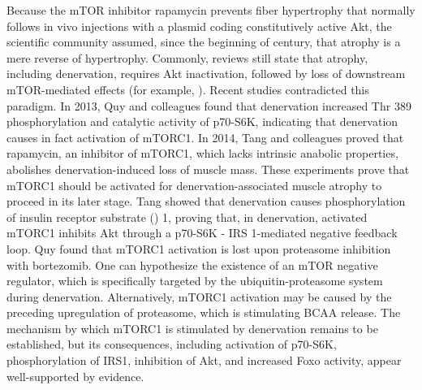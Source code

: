 \documentclass[12pt,english]{report}\usepackage[]{graphicx}\usepackage[]{color}
\begin{document}
Because the mTOR inhibitor rapamycin prevents fiber hypertrophy that
normally follows in vivo injections with a plasmid coding constitutively
active Akt\citep{bodine2001akt/mtor}, the scientific community assumed,
since the beginning of century, that atrophy is a mere reverse of
hypertrophy. Commonly, reviews still state that atrophy, including
denervation, requires Akt inactivation, followed by loss of downstream
mTOR-mediated effects (for example, \citep{zhao2007foxo3,schiaffino2013mechanisms}).
Recent studies contradicted this paradigm. In 2013, Quy and colleagues
found that denervation increased Thr 389 phosphorylation and catalytic
activity of p70-S6K, indicating that denervation causes in fact activation
of mTORC1\citep{quy2013proteasome-dependent}. In 2014, Tang and colleagues
proved that rapamycin, an inhibitor of mTORC1, which lacks intrinsic
anabolic properties, abolishes denervation-induced loss of muscle
mass\citep{tang2014mtorc1}. These experiments prove that mTORC1 should
be activated for denervation-associated muscle atrophy to proceed
in its later stage. Tang showed that denervation causes phosphorylation
of insulin receptor substrate ()
1, proving that, in denervation, activated mTORC1 inhibits Akt through
a p70-S6K - IRS 1-mediated negative feedback loop. Quy found that
mTORC1 activation is lost upon proteasome inhibition with bortezomib.
One can hypothesize the existence of an mTOR negative regulator, which
is specifically targeted by the ubiquitin-proteasome system during
denervation. Alternatively, mTORC1 activation may be caused by the
preceding upregulation of proteasome, which is stimulating BCAA release.
The mechanism by which mTORC1 is stimulated by denervation remains
to be established, but its consequences, including activation of p70-S6K,
phosphorylation of IRS1, inhibition of Akt, and increased Foxo activity,
appear well-supported by evidence.
\end{document}
